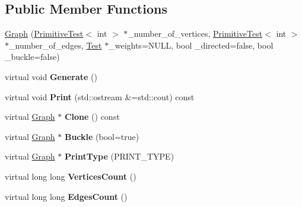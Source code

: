 \subsection*{Public Member Functions}
\begin{DoxyCompactItemize}
\item 
\hyperlink{class_graph_a480d475b69a6b892b044b255a5fb47f5}{Graph} (\hyperlink{class_primitive_test}{Primitive\+Test}$<$ int $>$ $\ast$\+\_\+number\+\_\+of\+\_\+vertices, \hyperlink{class_primitive_test}{Primitive\+Test}$<$ int $>$ $\ast$\+\_\+number\+\_\+of\+\_\+edges, \hyperlink{class_test}{Test} $\ast$\+\_\+weights=N\+U\+LL, bool \+\_\+directed=false, bool \+\_\+buckle=false)
\item 
\mbox{\label{class_graph_ad47d7f61d68ed142c03a442424764c30}} 
virtual void {\bfseries Generate} ()
\item 
\mbox{\label{class_graph_ac0953dd80558892dc281e17ae40fd5f1}} 
virtual void {\bfseries Print} (std\+::ostream \&=std\+::cout) const
\item 
\mbox{\label{class_graph_a6d122fe3d1c8b3e39d752e11ac801062}} 
virtual \hyperlink{class_graph}{Graph} $\ast$ {\bfseries Clone} () const
\item 
\mbox{\label{class_graph_a03a0063bfcfa48031135fda93e7da3f4}} 
virtual \hyperlink{class_graph}{Graph} $\ast$ {\bfseries Buckle} (bool=true)
\item 
\mbox{\label{class_graph_a38a58285e414869af2d4e6c911947d5f}} 
virtual \hyperlink{class_graph}{Graph} $\ast$ {\bfseries Print\+Type} (P\+R\+I\+N\+T\+\_\+\+T\+Y\+PE)
\item 
\mbox{\label{class_graph_a8eccb4ebab764cf134e527aaf648af19}} 
virtual long long {\bfseries Vertices\+Count} ()
\item 
\mbox{\label{class_graph_a80fc159f5508fb7ecf12f1273c60518f}} 
virtual long long {\bfseries Edges\+Count} ()
\end{DoxyCompactItemize}
